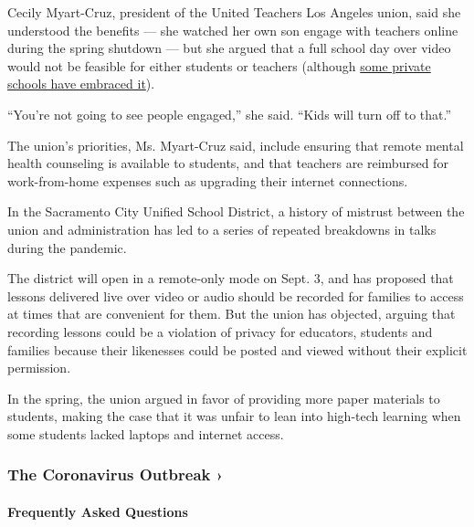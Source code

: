 Cecily Myart-Cruz, president of the United Teachers Los Angeles union,
said she understood the benefits --- she watched her own son engage with
teachers online during the spring shutdown --- but she argued that a
full school day over video would not be feasible for either students or
teachers (although
\href{https://www.nytimes3xbfgragh.onion/2020/05/09/us/coronavirus-public-private-school.html}{some
private schools have embraced it}).

``You're not going to see people engaged,'' she said. ``Kids will turn
off to that.''

The union's priorities, Ms. Myart-Cruz said, include ensuring that
remote mental health counseling is available to students, and that
teachers are reimbursed for work-from-home expenses such as upgrading
their internet connections.

In the Sacramento City Unified School District, a history of mistrust
between the union and administration has led to a series of repeated
breakdowns in talks during the pandemic.

The district will open in a remote-only mode on Sept. 3, and has
proposed that lessons delivered live over video or audio should be
recorded for families to access at times that are convenient for them.
But the union has objected, arguing that recording lessons could be a
violation of privacy for educators, students and families because their
likenesses could be posted and viewed without their explicit permission.

In the spring, the union argued in favor of providing more paper
materials to students, making the case that it was unfair to lean into
high-tech learning when some students lacked laptops and internet
access.

\href{https://www.nytimes3xbfgragh.onion/news-event/coronavirus?action=click\&pgtype=Article\&state=default\&region=MAIN_CONTENT_3\&context=storylines_faq}{}

\hypertarget{the-coronavirus-outbreak-}{%
\subsubsection{The Coronavirus Outbreak
›}\label{the-coronavirus-outbreak-}}

\hypertarget{frequently-asked-questions}{%
\paragraph{Frequently Asked
Questions}\label{frequently-asked-questions}}

